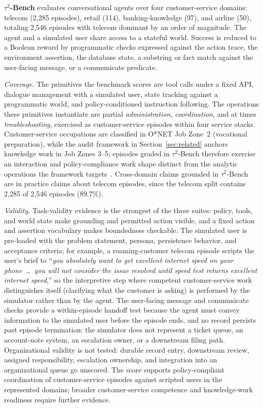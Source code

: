 \documentclass{article}
\begin{document}
\textbf{$\tau^2$-Bench} evaluates conversational agents over four customer-service domains: telecom (2{,}285 episodes), retail (114), banking-knowledge (97), and airline (50), totaling 2{,}546 episodes with telecom dominant by an order of magnitude.
The agent and a simulated user share access to a stateful world.
Success is reduced to a Boolean reward by programmatic checks expressed against the action trace, the environment assertion, the database state, a substring or fact match against the user-facing message, or a communicate predicate.

\textit{Coverage.}
The primitives the benchmark scores are tool calls under a fixed API, dialogue management with a simulated user, state tracking against a programmatic world, and policy-conditioned instruction following.
The operations these primitives instantiate are partial \emph{administration}, \emph{coordination}, and at times \emph{troubleshooting}, exercised as customer-service episodes within four service stacks.
Customer-service occupations are classified in O{*}NET Job Zone~2 (vocational preparation), while the audit framework in Section~\ref{sec:related} anchors knowledge work in Job Zones 3--5; episodes graded in $\tau^2$-Bench therefore exercise an interaction and policy-compliance work shape distinct from the analytic operations the framework targets~\citep{onet2024tasks}.
Cross-domain claims grounded in $\tau^2$-Bench are in practice claims about telecom episodes, since the telecom split contains 2{,}285 of 2{,}546 episodes (89.7\%).

\textit{Validity.}
Task-validity evidence is the strongest of the three suites: policy, tools, and world state make grounding and permitted action visible, and a fixed action and assertion vocabulary makes boundedness checkable.
The simulated user is pre-loaded with the problem statement, persona, persistence behavior, and acceptance criteria; for example, a roaming-customer telecom episode scripts the user's brief to ``\emph{you absolutely want to get excellent internet speed on your phone~\ldots~you will not consider the issue resolved until speed test returns excellent internet speed},'' so the interpretive step where competent customer-service work distinguishes itself (clarifying what the customer is asking) is performed by the simulator rather than by the agent.
The user-facing message and communicate checks provide a within-episode handoff test because the agent must convey information to the simulated user before the episode ends, and no record persists past episode termination: the simulator does not represent a ticket queue, an account-note system, an escalation owner, or a downstream filing path.
Organizational validity is not tested: durable record entry, downstream review, assigned responsibility, escalation ownership, and integration into an organizational queue go unscored.
The score supports policy-compliant coordination of customer-service episodes against scripted users in the represented domains; broader customer-service competence and knowledge-work readiness require further evidence.
\end{document}

